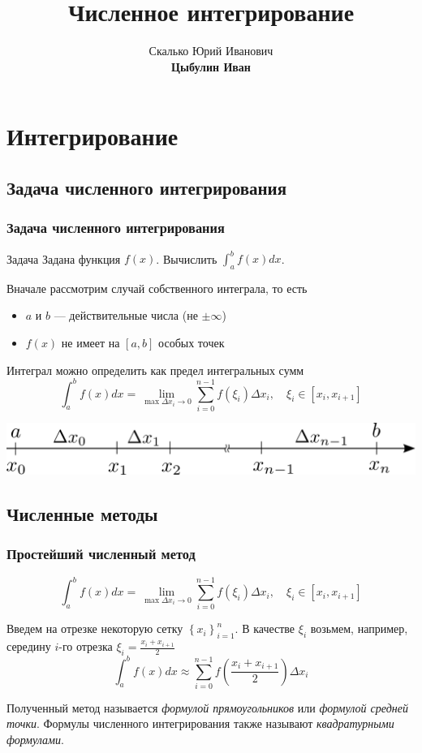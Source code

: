 \documentclass[apectratio=43,unicode]{beamer}
\title[Интегрирование]{Численное интегрирование}
\author[Цыбулин Иван]{Скалько Юрий Иванович\\
\textbf{Цыбулин Иван}}
\date{}
\begin{document}
\begin{frame}[plain]
\titlepage
\end{frame}

\newcommand\myframe[2]{\subsection{#1}\frame{\frametitle{#1}{#2}}}

\section{Интегрирование}
\subsection{Задача численного интегрирования}
\begin{frame}
\frametitle{Задача численного интегрирования}
	\begin{block}{Задача}
		Задана функция $f(x)$. Вычислить $\displaystyle\int_a^b f(x) dx$.
	\end{block}
	\pause

	Вначале рассмотрим случай собственного интеграла, то есть
	\begin{itemize}
		\item $a$ и $b$ --- действительные числа (не $\pm \infty$)
		\item $f(x)$ не имеет на $[a,b]$ особых точек
	\end{itemize}
	\pause

	Интеграл можно определить как предел интегральных сумм
	\[
	\int_a^b f(x) dx = \lim_{\max \Delta x_i \rightarrow 0} \sum_{i=0}^{n-1}
f(\xi_i) \Delta x_i,\quad \xi_i \in [x_i,x_{i+1}]
	\]

	\includegraphics[width=\textwidth]{grid.png}
\end{frame}

\subsection{Численные методы}
\begin{frame}
\frametitle{Простейший численный метод}
	\[
	\int_a^b f(x) dx = \lim_{\max \Delta x_i \rightarrow 0} \sum_{i=0}^{n-1} f(\xi_i) \Delta x_i,\quad \xi_i \in [x_i,x_{i+1}]
	\]

	Введем на отрезке некоторую сетку $\left\{x_i\right\}_{i = 1}^n$. В качестве $\xi_i$ возьмем, например, середину $i$-го отрезка
	$ \xi_i = \frac{x_i+x_{i+1}}{2} $
	\pause
	\[
	\int_a^b f(x) dx \approx \sum_{i=0}^{n-1} f\left(\frac{x_i+x_{i+1}}{2}\right)\Delta x_i
	\]
	\pause

	Полученный метод называется \emph{формулой прямоугольников} или
	\emph{формулой средней точки}. Формулы численного интегрирования также
	называют \emph{квадратурными формулами}.
\end{frame}
\end{document}
